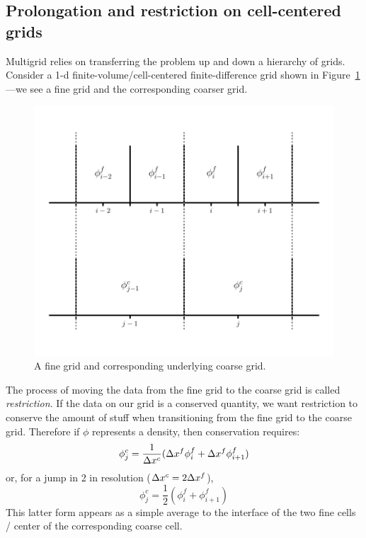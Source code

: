 \subsection{Prolongation and restriction on cell-centered grids}

Multigrid relies on transferring the problem up and down a hierarchy of
grids.  Consider a 1-d finite-volume/cell-centered finite-difference grid
shown in Figure~\ref{fig:mg:1dgrid-prolong}---we see a fine grid and the
corresponding coarser grid.
%
\begin{figure}[t]
\centering
\includegraphics[width=0.8\linewidth]{fvrestrict}
\caption[The geometry for 1-d
  prolongation and restriction]{\label{fig:mg:1dgrid-prolong} A fine grid and
  corresponding underlying coarse grid.}
\end{figure}
%
The process of moving the data from the fine grid to the coarse grid
is called {\em restriction}.  If the data on our grid is a conserved 
quantity, we want restriction to conserve the amount of stuff when transitioning
from the fine grid to the coarse grid.  Therefore if $\phi$ represents a density,
then conservation requires:
\begin{equation}
\phi^c_j = \frac{1}{\Delta x^c} (\Delta x^f \phi^f_i + \Delta x^f \phi^f_{i+1} )
\end{equation}
or, for a jump in 2 in resolution ($\Delta x^c = 2 \Delta x^f$), 
\begin{equation}
\phi^c_j = \frac{1}{2} (\phi^f_i + \phi^f_{i+1} )
\end{equation}
This latter form appears as a simple average to the interface of the
two fine cells / center of the corresponding coarse cell.

